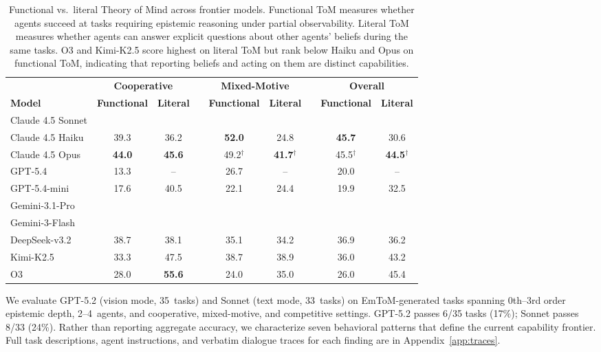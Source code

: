 \documentclass{article} %
\begin{document}
\begin{table}[t]
\centering
\small
\renewcommand{\arraystretch}{1.25}
\setlength{\tabcolsep}{4.5pt}
\begin{tabular}{@{} l cc c cc c cc @{}}
\toprule
& \multicolumn{2}{c}{\textbf{Cooperative}} & \phantom{a}
& \multicolumn{2}{c}{\textbf{Mixed-Motive}} & \phantom{a}
& \multicolumn{2}{c}{\textbf{Overall}} \\
\cmidrule{2-3} \cmidrule{5-6} \cmidrule{8-9}
\textbf{Model}
& \textbf{Functional} & \textbf{Literal}
&& \textbf{Functional} & \textbf{Literal}
&& \textbf{Functional} & \textbf{Literal} \\
\midrule
Claude 4.5 Sonnet \\
Claude 4.5 Haiku            & 39.3 & 36.2 && \textbf{52.0} & 24.8 && \textbf{45.7} & 30.6 \\
Claude 4.5 Opus             & \textbf{44.0} & \textbf{45.6} && 49.2$^\dagger$ & \textbf{41.7}$^\dagger$ && 45.5$^\dagger$ & \textbf{44.5}$^\dagger$ \\
\hline
GPT-5.4          & 13.3 & --   && 26.7 & --   && 20.0 & --   \\
GPT-5.4-mini     & 17.6 & 40.5 && 22.1 & 24.4 && 19.9 & 32.5 \\
\hline
Gemini-3.1-Pro\\
Gemini-3-Flash\\
\hline
DeepSeek-v3.2    & 38.7 & 38.1 && 35.1 & 34.2 && 36.9 & 36.2 \\
Kimi-K2.5        & 33.3 & 47.5 && 38.7 & 38.9 && 36.0 & 43.2 \\
O3               & 28.0 & \textbf{55.6} && 24.0 & 35.0 && 26.0 & 45.4 \\

\bottomrule
\end{tabular}

\vspace{2pt}
\caption{Functional vs.\ literal Theory of Mind across frontier models. Functional ToM measures whether agents succeed at tasks requiring epistemic reasoning under partial observability. Literal ToM measures whether agents can answer explicit questions about other agents' beliefs during the same tasks. O3 and Kimi-K2.5 score highest on literal ToM but rank below Haiku and Opus on functional ToM, indicating that reporting beliefs and acting on them are distinct capabilities.}
\label{tab:main_results}
\end{table}

We evaluate GPT-5.2 (vision mode, 35~tasks) and Sonnet (text mode, 33~tasks) on EmToM-generated tasks spanning 0th--3rd order epistemic depth, 2--4~agents, and cooperative, mixed-motive, and competitive settings. GPT-5.2 passes 6/35 tasks (17\%); Sonnet passes 8/33 (24\%). Rather than reporting aggregate accuracy, we characterize seven behavioral patterns that define the current capability frontier. Full task descriptions, agent instructions, and verbatim dialogue traces for each finding are in Appendix~\ref{app:traces}.
\end{document}
